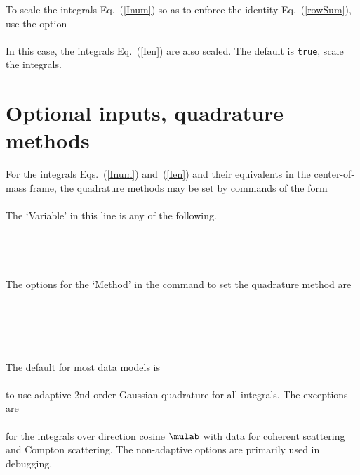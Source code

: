 To scale the integrals Eq.~(\ref{Inum}) so as to enforce the identity
Eq.~(\ref{rowSum}), use the option\\
  \\
In this case, the integrals Eq.~(\ref{Ien}) are also scaled.  The default
is \texttt{true}, scale the integrals.

\section{Optional inputs, quadrature methods}\label{Sec:QuadratureMethods}
For the integrals Eqs.~(\ref{Inum}) and~(\ref{Ien}) and their equivalents
in the center-of-mass frame, the quadrature methods may be set
by commands of the form\\
  \\
The `Variable' in this line is any of the following.\\
  \\
  \\
  \\
  \\
The options for the `Method' in the command to set the quadrature method
are\\
  \\
  \\
  \\
  \\
  \\
The default for most data models is\\
  \\
to use adaptive 2nd-order Gaussian  quadrature for all integrals.
The exceptions are\\
  \\
for the integrals over direction cosine $\mulab$ with data for
coherent scattering and Compton scattering.  The non-adaptive options
are primarily used in debugging.

